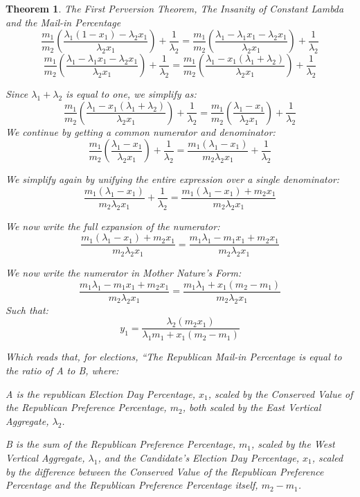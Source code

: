\documentclass[preprint,13pt]{elsarticle}
\newtheorem{theorem}{Theorem}[section]
\begin{document}
\begin{theorem}{The First Perversion Theorem, The Insanity of Constant Lambda and the Mail-in Percentage}
$$\frac{m_{1}}{m_{2}}\left(\frac{\lambda_{1}(1-x_{1})-\lambda_{2}x_{1}}{\lambda_{2}x_{1}} \right)+\frac{1}{\lambda_{2}}=\frac{m_{1}}{m_{2}}\left(\frac{\lambda_{1}-\lambda_{1}x_{1}-\lambda_{2}x_{1}}{\lambda_{2}x_{1}} \right)+\frac{1}{\lambda_{2}}$$
$$\frac{m_{1}}{m_{2}}\left(\frac{\lambda_{1}-\lambda_{1}x_{1}-\lambda_{2}x_{1}}{\lambda_{2}x_{1}} \right)+\frac{1}{\lambda_{2}}=\frac{m_{1}}{m_{2}}\left(\frac{\lambda_{1}-x_{1}(\lambda_{1}+\lambda_{2})}{\lambda_{2}x_{1}} \right)+\frac{1}{\lambda_{2}}$$

Since $\lambda_{1}+\lambda_{2}$ is equal to one, we simplify as:
$$\frac{m_{1}}{m_{2}}\left(\frac{\lambda_{1}-x_{1}(\lambda_{1}+\lambda_{2})}{\lambda_{2}x_{1}} \right)+\frac{1}{\lambda_{2}}=\frac{m_{1}}{m_{2}}\left(\frac{\lambda_{1}-x_{1}}{\lambda_{2}x_{1}} \right)+\frac{1}{\lambda_{2}}$$
\newpage
We continue by getting a common numerator and denominator:
$$\frac{m_{1}}{m_{2}}\left(\frac{\lambda_{1}-x_{1}}{\lambda_{2}x_{1}} \right)+\frac{1}{\lambda_{2}}=\frac{m_{1}(\lambda_{1}-x_{1})}{m_{2}\lambda_{2}x_{1}}+\frac{1}{\lambda_{2}}$$

We simplify again by unifying the entire expression over a single denominator:
$$\frac{m_{1}(\lambda_{1}-x_{1})}{m_{2}\lambda_{2}x_{1}}+\frac{1}{\lambda_{2}}=\frac{m_{1}(\lambda_{1}-x_{1})+m_{2}x_{1}}{m_{2}\lambda_{2}x_{1}}$$

We now write the full expansion of the numerator:
$$\frac{m_{1}(\lambda_{1}-x_{1})+m_{2}x_{1}}{m_{2}\lambda_{2}x_{1}}=\frac{m_{1}\lambda_{1}-m_{1}x_{1}+m_{2}x_{1}}{m_{2}\lambda_{2}x_{1}}$$

We now write the numerator in Mother Nature's Form:
$$\frac{m_{1}\lambda_{1}-m_{1}x_{1}+m_{2}x_{1}}{m_{2}\lambda_{2}x_{1}}=\frac{m_{1}\lambda_{1}+x_{1}(m_{2}-m_{1})}{m_{2}\lambda_{2}x_{1}}$$
Such that:
$$y_{1}=\frac{\lambda_{2}(m_{2}x_{1})}{\lambda_{1}m_{1}+x_{1}(m_{2}-m_{1})}$$

Which reads that, for elections, ``The Republican Mail-in Percentage is equal to the ratio of A to B, where:

A is the republican Election Day Percentage, $x_{1}$, scaled by the Conserved Value of the Republican Preference Percentage, $m_{2}$, both scaled by the East Vertical Aggregate, $\lambda_{2}$.

B is the sum of the Republican Preference Percentage, $m_{1}$, scaled by the West Vertical Aggregate, $\lambda_{1}$, and the Candidate's Election Day Percentage, $x_{1}$, scaled by the difference between the Conserved Value of the Republican Preference Percentage and the Republican Preference Percentage itself, $m_{2}-m_{1}$.


\end{theorem}
\end{document}

